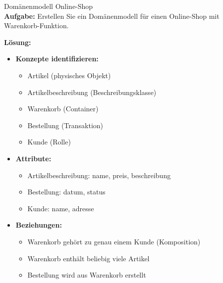 \begin{example2}{Domänenmodell Online-Shop}\\
    \small
\textbf{Aufgabe:} Erstellen Sie ein Domänenmodell für einen Online-Shop mit Warenkorb-Funktion.

\textbf{Lösung:}
\begin{itemize}
    \item \textbf{Konzepte identifizieren:}
    \begin{itemize}
        \item Artikel (physisches Objekt)
        \item Artikelbeschreibung (Beschreibungsklasse)
        \item Warenkorb (Container)
        \item Bestellung (Transaktion)
        \item Kunde (Rolle)
    \end{itemize}
    \item \textbf{Attribute:}
    \begin{itemize}
        \item Artikelbeschreibung: name, preis, beschreibung
        \item Bestellung: datum, status
        \item Kunde: name, adresse
    \end{itemize}
    \item \textbf{Beziehungen:}
    \begin{itemize}
        \item Warenkorb gehört zu genau einem Kunde (Komposition)
        \item Warenkorb enthält beliebig viele Artikel
        \item Bestellung wird aus Warenkorb erstellt
    \end{itemize}
\end{itemize}
\end{example2}

